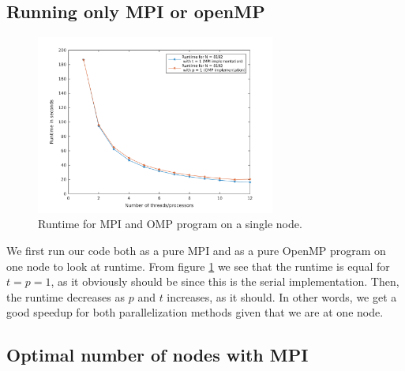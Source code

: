 \subsection*{Running only MPI or openMP}
\begin{figure}[h]
			\centering
			\includegraphics[width=0.7\textwidth]{./figures/runtime_either_MPI_OMP}
			\caption{Runtime for MPI and OMP program on a single node.}
			\label{fig:MPIvsOMP}
\end{figure}
We first run our code both as a pure MPI and as a pure OpenMP program on one node to look at runtime. From figure \ref{fig:MPIvsOMP} we see that the runtime is equal for $t = p = 1$, as it obviously should be since this is the serial implementation. Then, the runtime decreases as $p$ and $t$ increases, as it should. In other words, we get a good speedup for both parallelization methods given that we are at one node. 


\subsection*{Optimal number of nodes with MPI}

